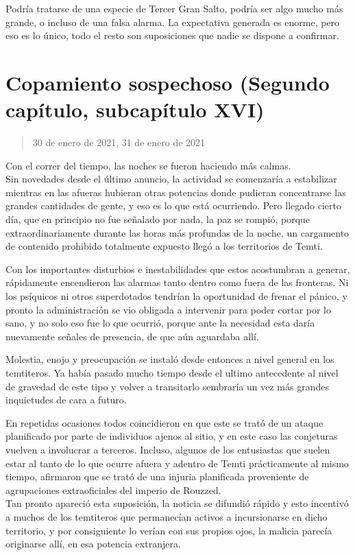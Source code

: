 \documentclass[
  spanish,
]{book}
\begin{document}
Podría tratarse de una especie de Tercer Gran Salto, podría ser algo mucho más grande, o incluso de una falsa alarma. La expectativa generada es enorme, pero eso es lo único, todo el resto son suposiciones que nadie se dispone a confirmar.

\hypertarget{copamiento-sospechoso-segundo-capuxedtulo-subcapuxedtulo-xvi}{%
\section{Copamiento sospechoso (Segundo capítulo, subcapítulo XVI)}\label{copamiento-sospechoso-segundo-capuxedtulo-subcapuxedtulo-xvi}}

\begin{quote}
30 de enero de 2021, 31 de enero de 2021
\end{quote}

Con el correr del tiempo, las noches se fueron haciendo más calmas.\\
Sin novedades desde el último anuncio, la actividad se comenzaría a estabilizar mientras en las afueras hubieran otras potencias donde pudieran concentrarse las grandes cantidades de gente, y eso es lo que está ocurriendo. Pero llegado cierto día, que en principio no fue señalado por nada, la paz se rompió, porque extraordinariamente durante las horas más profundas de la noche, un cargamento de contenido prohibido totalmente expuesto llegó a los territorios de Temti.

Con los importantes disturbios e inestabilidades que estos acostumbran a generar, rápidamente encendieron las alarmas tanto dentro como fuera de las fronteras. Ni los psíquicos ni otros superdotados tendrían la oportunidad de frenar el pánico, y pronto la administración se vio obligada a intervenir para poder cortar por lo sano, y no solo eso fue lo que ocurrió, porque ante la necesidad esta daría nuevamente señales de presencia, de que aún aguardaba allí.

Molestia, enojo y preocupación se instaló desde entonces a nivel general en los temtiteros. Ya había pasado mucho tiempo desde el ultimo antecedente al nivel de gravedad de este tipo y volver a transitarlo sembraría un vez más grandes inquietudes de cara a futuro.

En repetidas ocasiones todos coincidieron en que este se trató de un ataque planificado por parte de individuos ajenos al sitio, y en este caso las conjeturas vuelven a involucrar a terceros. Incluso, algunos de los entusiastas que suelen estar al tanto de lo que ocurre afuera y adentro de Temti prácticamente al mismo tiempo, afirmaron que se trató de una injuria planificada proveniente de agrupaciones extraoficiales del imperio de Rouzzed.\\
Tan pronto apareció esta suposición, la noticia se difundió rápido y esto incentivó a muchos de los temtiteros que permanecían activos a incursionarse en dicho territorio, y por consiguiente lo verían con sus propios ojos, la malicia parecía originarse allí, en esa potencia extranjera.
\end{document}
